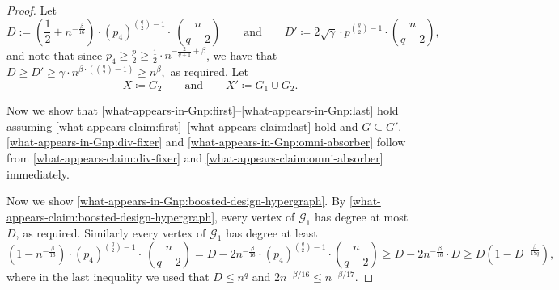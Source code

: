 \documentclass[11pt]{article}
\numberwithin{equation}{section}
\newcommand{\mc}[1]{\mathcal{#1}}
\newcounter{i}
\theoremstyle{plain}
\theoremstyle{plain} %
\theoremstyle{definition}
\newcommand{\cG}{\mathcal{G}}
\begin{document}
\begin{proof}
Let $$D:= \left(\frac{1}{2} + n^{-\frac{\beta}{16}}\right)\cdot (p_4)^{\binom{q}{2}-1}\cdot~\binom{n}{q-2}\qquad\text{and}\qquad D' \coloneqq 2\sqrt{\gamma}\cdot p^{\binom{q}{2}-1}\cdot\binom{n}{q-2},$$
and note that since $p_4 \ge \frac{p}{2} \ge \frac{1}{2}\cdot n^{-\frac{2}{q+1} + \beta}$, we have that $D \ge D' \geq \gamma \cdot n^{\beta \cdot \left(\binom{q}{2}-1\right)}\ge n^{\beta},$ as required.
Let
\begin{equation*}
  X \coloneqq G_2 \qquad\text{and}\qquad X' \coloneqq G_1 \cup G_2.
\end{equation*}


Now we show that \ref{what-appears-in-Gnp:first}--\ref{what-appears-in-Gnp:last} hold assuming \ref{what-appears-claim:first}--\ref{what-appears-claim:last} hold and $G \subseteq G'$.
\ref{what-appears-in-Gnp:div-fixer} and \ref{what-appears-in-Gnp:omni-absorber} follow from \ref{what-appears-claim:div-fixer} and \ref{what-appears-claim:omni-absorber} immediately.

Now we show \ref{what-appears-in-Gnp:boosted-design-hypergraph}.
By \ref{what-appears-claim:boosted-design-hypergraph}, every vertex of $\cG_1$ has degree at most $D$, as required.
Similarly every vertex of $\mc{G}_1$ has degree at least 
\begin{equation*}
    \left(1-n^{-\frac{\beta}{16}}\right)\cdot (p_4)^{\binom{q}{2}-1}\cdot~\binom{n}{q-2} = D - 2n^{-\frac{\beta}{16}}\cdot (p_4)^{\binom{q}{2}-1}\cdot \binom{n}{q - 2} \geq D - 2n^{-\frac{\beta}{16}}\cdot D \geq D\left(1 - D^{-\frac{\beta}{17q}}\right),
\end{equation*}
where in the last inequality we used that $D \leq n^q$ and $2n^{-\beta / 16} \leq n^{-\beta / 17}$.


\end{proof}
\end{document}
